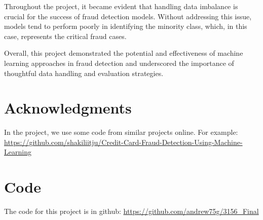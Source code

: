 \documentclass[11pt]{article}
\begin{document}
Throughout the project, it became evident that handling data imbalance is crucial for the success of fraud detection models. Without addressing this issue, models tend to perform poorly in identifying the minority class, which, in this case, represents the critical fraud cases. 

Overall, this project demonstrated the potential and effectiveness of machine learning approaches in fraud detection and underscored the importance of thoughtful data handling and evaluation strategies.
 

\section*{Acknowledgments}
In the project, we use some code from similar projects online. For example:
\url{https://github.com/shakiliitju/Credit-Card-Fraud-Detection-Using-Machine-Learning}

\section*{Code}
The code for this project is in github: \url{https://github.com/andrew75g/3156_Final}




\appendix


\end{document}
